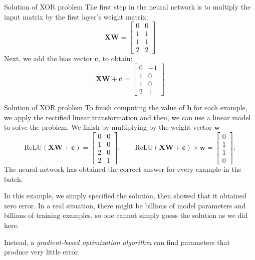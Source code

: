 \documentclass[10pt]{beamer}
\begin{document}
	\begin{frame}{Solution of XOR problem}
		The first step in the neural network is to multiply the input matrix by the first layer's weight matrix:
		$$\bm{XW}=\begin{bmatrix}
		0&0\\
		1&1\\
		1&1\\
		2&2
		\end{bmatrix}$$
		\pause
		Next, we add the bias vector $\bm{c}$, to obtain:
		$$\bm{XW}+\bm{c}=\begin{bmatrix}
		0&-1\\
		1&0\\
		1&0\\
		2&1
		\end{bmatrix}$$
	\end{frame}

	\begin{frame}{Solution of XOR problem}
		To finish computing the value of $\bm{h}$ for each example, we apply the rectified linear transformation and then, we can use a linear model to solve the problem. We finish by multiplying by the weight vector $\bm{w}$
		$$\mathrm{ReLU}(\bm{XW}+\bm{c})=\begin{bmatrix}
		0&0\\
		1&0\\
		2&0\\
		2&1
		\end{bmatrix};\qquad\mathrm{ReLU}(\bm{XW}+\bm{c})\times \bm{w}=\begin{bmatrix}
		0\\
		1\\
		1\\
		0
		\end{bmatrix};$$
		\pause
		The neural network has obtained the correct answer for every example in the batch.
		\pause
		
		In this example, we simply specified the solution, then showed that it obtained zero error. In a real situation, there might be billions of model parameters and billions of training examples, so one cannot simply guess the solution as we did here.
		\pause
		
		Instead, a \emph{gradient-based optimization algorithm} can find parameters that produce very little error.
	\end{frame}
	
\end{document}

